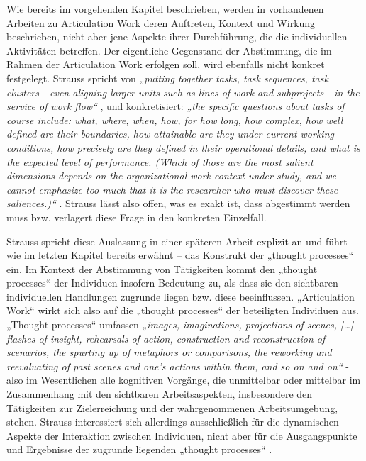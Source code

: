 Wie bereits im vorgehenden Kapitel beschrieben, werden in vorhandenen Arbeiten zu Articulation Work deren Auftreten, Kontext und Wirkung beschrieben, nicht aber jene Aspekte ihrer Durchführung, die die individuellen Aktivitäten betreffen. Der eigentliche Gegenstand der Abstimmung, die im Rahmen der Articulation Work erfolgen soll, wird ebenfalls nicht konkret festgelegt. Strauss spricht von \emph{„putting together tasks, task sequences, task clusters - even aligning larger units such as lines of work and subprojects - in the service of work flow“} \citep[][S. 2]{Strauss88}, und konkretisiert: \emph{„the specific questions about tasks of course include: what, where, when, how, for how long, how complex, how well defined are their boundaries, how attainable are they under current working conditions, how precisely are they defined in their operational details, and what is the expected level of performance. (Which of those are the most salient dimensions depends on the organizational work context under study, and we cannot emphasize too much that it is the researcher who must discover these saliences.)“} \citep[][S. 6]{Strauss85}. Strauss lässt also offen, was es exakt ist, dass abgestimmt werden muss bzw. verlagert diese Frage in den konkreten Einzelfall. 

Strauss spricht diese Auslassung in einer späteren Arbeit explizit an \citep[][S. 131]{Strauss93} und führt -- wie im letzten Kapitel bereits erwähnt -- das Konstrukt der „thought processes“ ein. Im Kontext der Abstimmung von Tätigkeiten kommt den „thought processes“ der Individuen insofern Bedeutung zu, als dass sie den sichtbaren individuellen Handlungen zugrunde liegen bzw. diese beeinflussen. „Articulation Work“ wirkt sich also auf die „thought processes“ der beteiligten Individuen aus. „Thought processes“ umfassen \emph{„images, imaginations, projections of scenes, [\ldots] flashes of insight, rehearsals of action, construction and reconstruction of scenarios,  the spurting up of metaphors or comparisons, the reworking and reevaluating of past scenes and one's actions within them, and so on and on“} \citep[][S. 130]{Strauss93} - also im Wesentlichen alle kognitiven Vorgänge, die unmittelbar oder mittelbar im Zusammenhang mit den sichtbaren Arbeitsaspekten, insbesondere den Tätigkeiten zur Zielerreichung und der wahrgenommenen Arbeitsumgebung, stehen. Strauss interessiert sich allerdings ausschließlich für die dynamischen Aspekte der Interaktion zwischen Individuen, nicht aber für die Ausgangspunkte und Ergebnisse der zugrunde liegenden „thought processes“ \citep[][S. 149]{Strauss93}.


